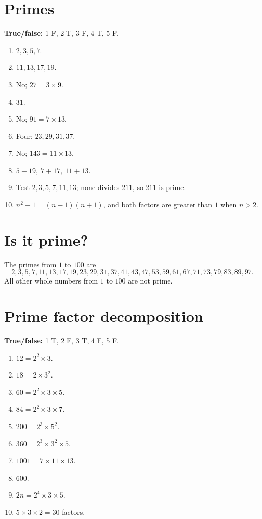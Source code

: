 \documentclass{article}
\begin{document}
\section*{Primes}
\textbf{True/false:} 1 F, 2 T, 3 F, 4 T, 5 F.

\begin{enumerate}[label=\arabic*., nosep, leftmargin=*]
\item \(2,3,5,7\).
\item \(11,13,17,19\).
\item No; \(27=3\times9\).
\item \(31\).
\item No; \(91=7\times13\).
\item Four: \(23,29,31,37\).
\item No; \(143=11\times13\).
\item \(5+19,\;7+17,\;11+13\).
\item Test \(2,3,5,7,11,13\); none divides \(211\), so \(211\) is prime.
\item \(n^2-1=(n-1)(n+1)\), and both factors are greater than \(1\) when \(n>2\).
\end{enumerate}

\section*{Is it prime?}
The primes from \(1\) to \(100\) are
\[
2,3,5,7,11,13,17,19,23,29,31,37,41,43,47,53,59,61,67,71,73,79,83,89,97.
\]
All other whole numbers from \(1\) to \(100\) are not prime.

\section*{Prime factor decomposition}
\textbf{True/false:} 1 T, 2 F, 3 T, 4 F, 5 F.

\begin{enumerate}[label=\arabic*., nosep, leftmargin=*]
\item \(12=2^2\times3\).
\item \(18=2\times3^2\).
\item \(60=2^2\times3\times5\).
\item \(84=2^2\times3\times7\).
\item \(200=2^3\times5^2\).
\item \(360=2^3\times3^2\times5\).
\item \(1001=7\times11\times13\).
\item \(600\).
\item \(2n=2^4\times3\times5\).
\item \(5\times3\times2=30\) factors.
\end{enumerate}
\end{document}
